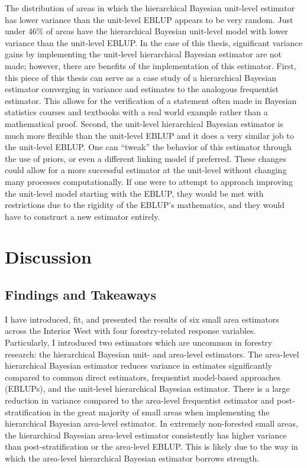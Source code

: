 \documentclass[12pt,twoside]{reedthesis}
\begin{document}
The distribution of areas in which the hierarchical Bayesian unit-level estimator has lower variance than the unit-level EBLUP appears to be very random. Just under 46\% of areas have the hierarchical Bayesian unit-level model with lower variance than the unit-level EBLUP. In the case of this thesis, significant variance gains by implementing the unit-level hierarchical Bayesian estimator are not made; however, there are benefits of the implementation of this estimator. First, this piece of this thesis can serve as a case study of a hierarchical Bayesian estimator converging in variance and estimates to the analogous frequentist estimator. This allows for the verification of a statement often made in Bayesian statistics courses and textbooks with a real world example rather than a mathematical proof. Second, the unit-level hierarchical Bayesian estimator is much more flexible than the unit-level EBLUP and it does a very similar job to the unit-level EBLUP. One can ``tweak'' the behavior of this estimator through the use of priors, or even a different linking model if preferred. These changes could allow for a more successful estimator at the unit-level without changing many processes computationally. If one were to attempt to approach improving the unit-level model starting with the EBLUP, they would be met with restrictions due to the rigidity of the EBLUP's mathematics, and they would have to construct a new estimator entirely.

\hypertarget{discussion}{%
\chapter{Discussion}\label{discussion}}

\hypertarget{findings-and-takeaways}{%
\section{Findings and Takeaways}\label{findings-and-takeaways}}

I have introduced, fit, and presented the results of six small area estimators across the Interior West with four forestry-related response variables. Particularly, I introduced two estimators which are uncommon in forestry research: the hierarchical Bayesian unit- and area-level estimators. The area-level hierarchical Bayesian estimator reduces variance in estimates significantly compared to common direct estimators, frequentist model-based approaches (EBLUPs), and the unit-level hierarchical Bayesian estimator. There is a large reduction in variance compared to the area-level frequentist estimator and post-stratification in the great majority of small areas when implementing the hierarchical Bayesian area-level estimator. In extremely non-forested small areas, the hierarchical Bayesian area-level estimator consistently has higher variance than post-stratification or the area-level EBLUP. This is likely due to the way in which the area-level hierarchical Bayesian estimator borrows strength.
\end{document}
